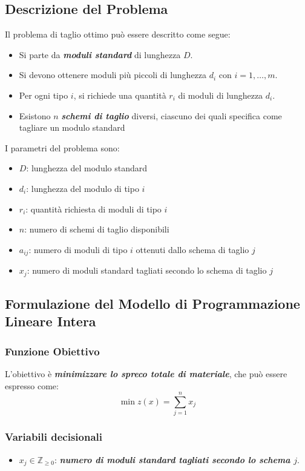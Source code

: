 \subsection{Descrizione del Problema}
Il problema di taglio ottimo può essere descritto come segue:
\begin{itemize}
    \item Si parte da \textbf{\textit{moduli standard}} di lunghezza $D$.
    \item Si devono ottenere moduli più piccoli di lunghezza $d_i$ con $i = 1, \ldots, m$.
    \item Per ogni tipo $i$, si richiede una quantità $r_i$ di moduli di lunghezza $d_i$.
    \item Esistono $n$ \textbf{\textit{schemi di taglio}} diversi, ciascuno dei quali specifica come tagliare un modulo standard
\end{itemize}

I parametri del problema sono:
\begin{itemize}
    \item $D$: lunghezza del modulo standard
    \item $d_i$: lunghezza del modulo di tipo $i$
    \item $r_i$: quantità richiesta di moduli di tipo $i$
    \item $n$: numero di schemi di taglio disponibili
    \item $a_{ij}$: numero di moduli di tipo $i$ ottenuti dallo schema di taglio $j$
    \item $x_j$: numero di moduli standard tagliati secondo lo schema di taglio $j$
\end{itemize}

\subsection{Formulazione del Modello di Programmazione Lineare Intera}
\subsubsection{Funzione Obiettivo}
L'obiettivo è \textbf{\textit{minimizzare lo spreco totale di materiale}}, che può essere espresso come:
\[
\min z(x) = \sum_{j=1}^{n} x_j
\]

\subsubsection{Variabili decisionali}
\begin{itemize}
    \item $x_j \in \mathbb{Z}_{\geq 0}$: \textbf{\textit{numero di moduli standard tagliati secondo lo schema $j$}}.
\end{itemize}

